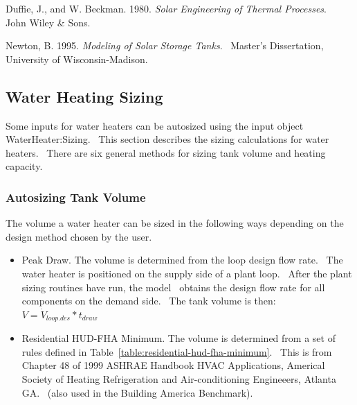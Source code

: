 Duffie, J., and W. Beckman. 1980. \emph{Solar Engineering of Thermal Processes}.~ John Wiley \& Sons.

Newton, B. 1995. \emph{Modeling of Solar Storage Tanks}.~ Master's Dissertation, University of Wisconsin-Madison.

\subsection{Water Heating Sizing}\label{water-heating-sizing}

Some inputs for water heaters can be autosized using the input object WaterHeater:Sizing.~ This section describes the sizing calculations for water heaters.~ There are six general methods for sizing tank volume and heating capacity.

\subsubsection{Autosizing Tank Volume}\label{autosizing-tank-volume}

The volume a water heater can be sized in the following ways depending on the design method chosen by the user.

\begin{itemize}
  \item Peak Draw. The volume is determined from the loop design flow rate.~ The water heater is positioned on the supply side of a plant loop.~ After the plant sizing routines have run, the model~ obtains the design flow rate for all components on the demand side.~ The tank volume is then: \(V = {\dot V_{loop.des}}*{t_{draw}}\)

  \item Residential HUD-FHA Minimum. The volume is determined from a set of rules defined in Table~\ref{table:residential-hud-fha-minimum}.~ This is from Chapter 48 of 1999 ASHRAE Handbook HVAC Applications, Americal Society of Heating Refrigeration and Air-conditioning Engineeers, Atlanta GA.~ (also used in the Building America Benchmark).
\end{itemize}

